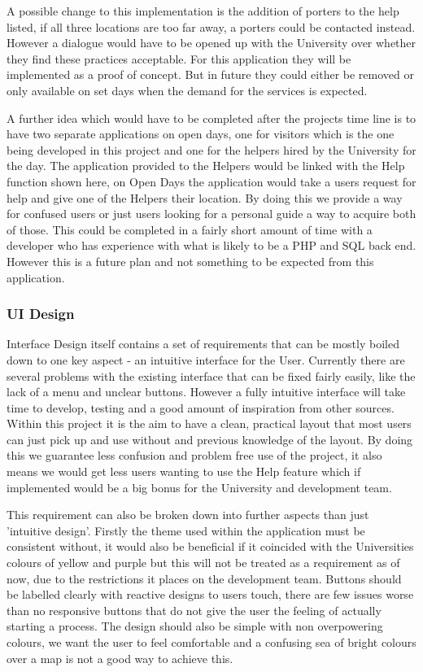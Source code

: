 A possible change to this implementation is the addition of porters to the help listed, if all three locations are too far away, a porters could be contacted instead. However a dialogue would have to be opened up with the University over whether they find these practices acceptable. For this application they will be implemented as a proof of concept. But in future they could either be removed or only available on set days when the demand for the services is expected.

A further idea which would have to be completed after the projects time line is to have two separate applications on open days, one for visitors which is the one being developed in this project and one for the helpers hired by the University for the day. The application provided to the Helpers would be linked with the Help function shown here, on Open Days the application would take a users request for help and give one of the Helpers their location. By doing this we provide a way for confused users or just users looking for a personal guide a way to acquire both of those. This could be completed in a fairly short amount of time with a developer who has experience with what is likely to be a PHP and SQL back end. However this is a future plan and not something to be expected from this application.  
\subsubsection{UI Design}
Interface Design itself contains a set of requirements that can be mostly boiled down to one key aspect - an intuitive interface for the User. Currently there are several problems with the existing interface that can be fixed fairly easily, like the lack of a menu and unclear buttons. However a fully intuitive interface will take time to develop, testing and a good amount of inspiration from other sources. Within this project it is the aim to have a clean, practical layout that most users can just pick up and use without and previous knowledge of the layout. By doing this we guarantee less confusion and problem free use of the project, it also means we would get less users wanting to use the Help feature which if implemented would be a big bonus for the University and development team. 

This requirement can also be broken down into further aspects than just 'intuitive design'. Firstly the theme used within the application must be consistent without, it would also be beneficial if it coincided with the Universities colours of yellow and purple but this will not be treated as a requirement as of now, due to the restrictions it places on the development team. Buttons should be labelled clearly with reactive designs to users touch, there are few issues worse than no responsive buttons that do not give the user the feeling of actually starting a process. The design should also be simple with non overpowering colours, we want the user to feel comfortable and a confusing sea of bright colours over a map is not a good way to achieve this.

